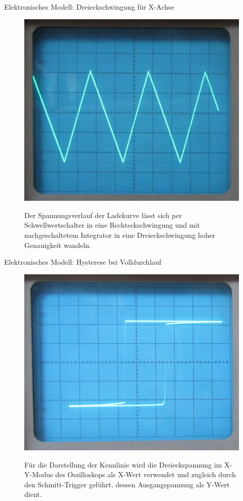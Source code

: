 \documentclass{beamer}
\begin{document}
\begin{frame}{Elektronisches Modell: Dreieckschwingung für X-Achse}
  \begin{figure}
    \centering
    \label{fig:sawtooth}
    {\includegraphics[width=0.5\paperwidth,center]
      {../images/sawtooth.jpg}}
    \caption{Der Spannungsverlauf der Ladekurve lässt sich per
      Schwellwertschalter in eine Rechteckschwingung und mit
      nachgeschaltetem Integrator in eine Dreieckschwingung hoher
      Genauigkeit wandeln.}
  \end{figure}
\end{frame}

\begin{frame}{Elektronisches Modell: Hysterese bei Volldurchlauf}
  \begin{figure}
    \centering
    \label{fig:hysteresis}
    {\includegraphics[width=0.5\paperwidth,center]
      {../images/hysteresis.jpg}}
    \caption{Für die Darstellung der Kennlinie wird die
      Dreieckspannung im X-Y-Modus des Oszilloskops als X-Wert
      verwendet und zugleich durch den Schmitt-Trigger geführt, dessen
      Ausgangspannung als Y-Wert dient.}
  \end{figure}
\end{frame}
\end{document}
